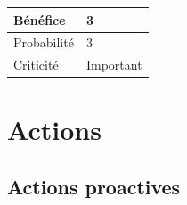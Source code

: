 \begin{table}[h]
\centering
	\begin{tabularx}{12.8cm}{|>{
	}X|X|}
	\hline
	Bénéfice & 3\\
	\hline
	Probabilité & 3\\
	\hline
	Criticité & Important\\
	\hline
	\end{tabularx}
\end{table}
\newpage

\section*{Actions}
\subsection*{Actions proactives}

